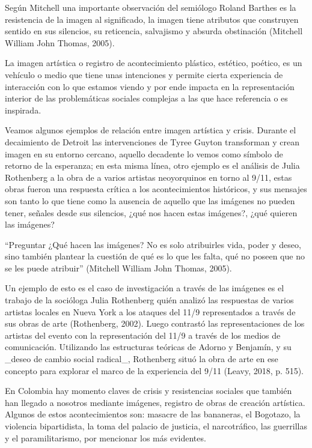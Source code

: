 Según Mitchell una importante observación del semiólogo Roland Barthes es la resistencia de la imagen al significado, la imagen tiene atributos que construyen sentido en sus silencios, su reticencia, salvajismo y absurda obstinación (Mitchell William John Thomas, 2005).

La imagen artística o registro de acontecimiento plástico, estético, poético, es un vehículo o medio que tiene unas intenciones y permite cierta experiencia de interacción con lo que estamos viendo y por ende impacta en la representación interior de las problemáticas sociales complejas a las que hace referencia o es inspirada.

Veamos algunos ejemplos de relación entre imagen artística y crisis. Durante el decaimiento de Detroit las intervenciones de Tyree Guyton transforman y crean imagen en su entorno cercano, aquello decadente lo vemos como símbolo de retorno de la esperanza; en esta misma línea, otro ejemplo es el análisis de Julia Rothenberg a la obra de a varios artistas neoyorquinos en torno al 9/11, estas obras fueron una respuesta crítica a los acontecimientos históricos, y sus mensajes son tanto lo que tiene como la ausencia de aquello que las imágenes no pueden tener, señales desde sus silencios, ¿qué nos hacen estas imágenes?, ¿qué quieren las imágenes?

“Preguntar ¿Qué hacen las imágenes? No es solo atribuirles vida, poder y deseo, sino también plantear la cuestión de qué es lo que les falta, qué no poseen que no se les puede atribuir” (Mitchell William John Thomas, 2005).

Un ejemplo de esto es el caso de investigación a través de las imágenes es el trabajo de la socióloga Julia Rothenberg quién analizó las respuestas de varios artistas locales en Nueva York a los ataques del 11/9 representados a través de sus obras de arte (Rothenberg, 2002). Luego contrastó las representaciones de los artistas del evento con la representación del 11/9 a través de los medios de comunicación. Utilizando las estructuras teóricas de Adorno y Benjamín, y su _deseo de cambio social radical_, Rothenberg situó la obra de arte en ese concepto para explorar el marco de la experiencia del 9/11 (Leavy, 2018, p. 515).

En Colombia hay momento claves de crisis y resistencias sociales que también han llegado a nosotros mediante imágenes, registro de obras de creación artística. Algunos de estos acontecimientos son: masacre de las bananeras, el Bogotazo, la violencia bipartidista, la toma del palacio de justicia, el narcotráfico, las guerrillas y el paramilitarismo, por mencionar los más evidentes.

